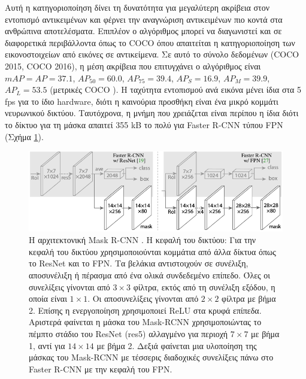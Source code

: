 Αυτή η κατηγοριοποίηση δίνει τη δυνατότητα για μεγαλύτερη ακρίβεια στον εντοπισμό αντικειμένων και φέρνει την αναγνώριση αντικειμένων πιο κοντά στα ανθρώπινα αποτελέσματα. Επιπλέον ο αλγόριθμος μπορεί να διαγωνιστεί και σε διαφορετικά περιβάλλοντα όπως το COCO όπου απαιτείται η κατηγοριοποίηση των εικονοστοιχείων από εικόνες σε αντικείμενα. Σε αυτό το σύνολο δεδομένων (COCO 2015, COCO 2016), η μέση ακρίβεια που επιτυγχάνει ο αλγόριθμος είναι $ mAP = AP = 37.1$, $ AP_{50} = 60.0 $, $AP_{75} = 39.4$, $ AP_S = 16.9$, $ AP_M = 39.9$, $ AP_L = 53.5 $ (μετρικές COCO \cite{15}). Η ταχύτητα εντοπισμού ανά εικόνα μένει ίδια στα 5 fps για το ίδιο hardware, διότι η καινούρια προσθήκη είναι ένα μικρό κομμάτι νευρωνικού δικτύου. Ταυτόχρονα, η μνήμη που χρειάζεται είναι περίπου η ίδια διότι το δίκτυο για τη μάσκα απαιτεί 355 kB το πολύ για Faster R-CNN τύπου FPN (Σχήμα \ref{fig:Mask_RCNN_architecture}).

\begin{figure}
\centerline{
\includegraphics[width = \textwidth]{figures/RCNN/Mask-RCNN_architecture.png}
}
\caption[Αρχιτεκτονική Mask R-CNN]{Η αρχιτεκτονική Mask R-CNN \cite{13}. Η κεφαλή του δικτύου: Για την κεφαλή του δικτύου χρησιμοποιούνται κομμάτια από άλλα δίκτυα όπως το ResNet\cite{21} και το FPN\cite{22}. Τα βελάκια αντιστοιχούν σε συνέλιξη, αποσυνέλιξη ή πέρασμα από ένα ολικά συνδεδεμένο επίπεδο. Όλες οι συνελίξεις γίνονται από $3\times3$ φίλτρα, εκτός από τη συνέλιξη εξόδου, η οποία είναι $1\times1$. Οι αποσυνελίξεις γίνονται από $2\times2$ φίλτρα με βήμα 2. Επίσης η ενεργοποίηση χρησιμοποιεί ReLU στα κρυφά επίπεδα. Αριστερά φαίνεται η μάσκα του Mask-RCNN χρησιμοποιώντας το πέμπτο στάδιο του ResNet (res5) αλλαγμένο για περιοχή $7\times7$ με βήμα 1, αντί για $14\times14$ με βήμα 2. Δεξιά φαίνεται μια υλοποίηση της μάσκας του Mask-RCNN με τέσσερις διαδοχικές συνελίξεις πάνω στο Faster R-CNN με την κεφαλή του FPN.}
\label{fig:Mask_RCNN_architecture}
\end{figure}

